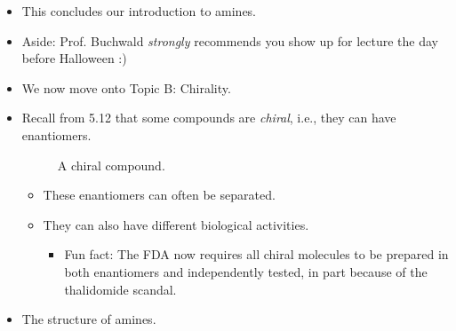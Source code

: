 \documentclass[../notes.tex]{subfiles}
\begin{document}
\begin{itemize}
\begin{figure}[h!]
        \footnotesize
        \caption{Quaternary ammonium salt example.}
        \label{fig:amineEx4}
    \end{figure}
    \begin{itemize}
        \item Example: Acetylcholine, an important neurotransmitter (Figure \ref{fig:amineEx4}).
    \end{itemize}
    \pagebreak
    \item This concludes our introduction to amines.
    \item Aside: Prof. Buchwald \emph{strongly} recommends you show up for lecture the day before Halloween :)
    \item We now move onto Topic B: Chirality.
    \item Recall from 5.12 that some compounds are \emph{chiral}, i.e., they can have enantiomers.
    \begin{figure}[h!]
        \centering
        \footnotesize
        \caption{A chiral compound.}
        \label{fig:chiralC}
    \end{figure}
    \begin{itemize}
        \item These enantiomers can often be separated.
        \item They can also have different biological activities.
        \begin{itemize}
            \item Fun fact: The FDA now requires all chiral molecules to be prepared in both enantiomers and independently tested, in part because of the thalidomide scandal.
        \end{itemize}
    \end{itemize}
    \item The structure of amines.
    \begin{figure}[h!]
        \centering
        \vspace{2em}
        \footnotesize
\end{figure}
\end{itemize}
\end{document}
